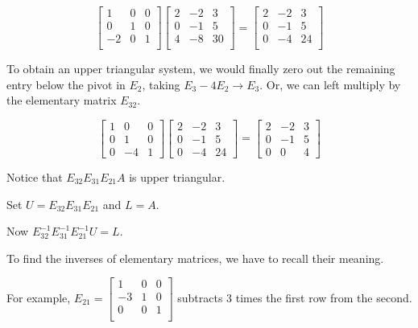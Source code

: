 \documentclass[12pt]{article}
\begin{document}
\begin{equation*}
  \begin{bmatrix}
    1 & 0 & 0\\
    0 & 1 & 0\\
    -2 & 0 & 1\\
  \end{bmatrix}
  \begin{bmatrix}
    2 & -2 & 3\\
    0 & -1 & 5\\
    4 & -8 & 30\\
  \end{bmatrix}
  =
  \begin{bmatrix}
    2 & -2 & 3\\
    0 & -1 & 5\\
    0 & -4 & 24\\
  \end{bmatrix}
\end{equation*}

To obtain an upper triangular system, we would finally zero out the remaining
entry below the pivot in $E_2$, taking $E_3-4E_2 \to E_3$. Or, we can left
multiply by the elementary matrix $E_{32}$.

\begin{equation*}
  \begin{bmatrix}
    1 & 0 & 0 \\
    0 & 1 & 0 \\
    0 & -4 & 1
  \end{bmatrix}
  \begin{bmatrix}
    2 & -2 & 3 \\
    0 & -1 & 5 \\
    0 & -4 & 24
  \end{bmatrix}
  =
  \begin{bmatrix}
    2 & -2 & 3 \\
    0 & -1 & 5 \\
    0 & 0 & 4
  \end{bmatrix}
\end{equation*}

Notice that $E_{32}E_{31}E_{21}A$ is upper triangular.

Set $U=E_{32}E_{31}E_{21}$ and $L=A$.

Now $E_{32}^{-1}E_{31}^{-1}E_{21}^{-1}U=L$.

To find the inverses of elementary matrices, we have to recall their meaning.

For example, $E_{21} = \begin{bmatrix}
1 & 0 & 0\\
-3 & 1 & 0\\
0 & 0 & 1\\
\end{bmatrix}$ subtracts $3$ times the first row from the second.
\end{document}
